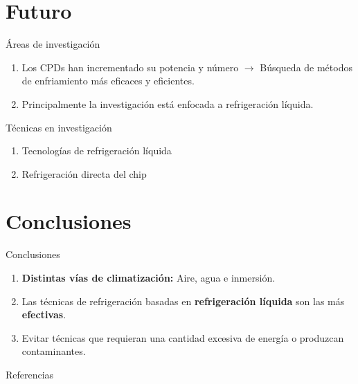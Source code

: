 \documentclass[aspectratio=169, compress]{beamer}
\begin{document}
\section{Futuro}

\begin{frame}{Áreas de investigación}
    \begin{enumerate}
        \item Los CPDs han incrementado su potencia y número $\rightarrow$ Búsqueda de métodos de enfriamiento más eficaces y eficientes.
        \item Principalmente la investigación está enfocada a refrigeración líquida.
    \end{enumerate}
\end{frame}

\begin{frame}{Técnicas en investigación}
    \begin{enumerate}
        \item Tecnologías de refrigeración líquida
        \item Refrigeración directa del chip
    \end{enumerate}
\end{frame}


\section{Conclusiones}

\begin{frame}{Conclusiones}
    \begin{enumerate}
        \item \textbf{Distintas vías de climatización:} Aire, agua e inmersión.
        \item Las técnicas de refrigeración basadas en \textbf{refrigeración líquida} son las más \textbf{efectivas}.
        \item Evitar técnicas que requieran una cantidad excesiva de energía o produzcan contaminantes.

    \end{enumerate}
\end{frame}

\begin{frame}{Referencias}
    
    
\end{frame}
\end{document}
